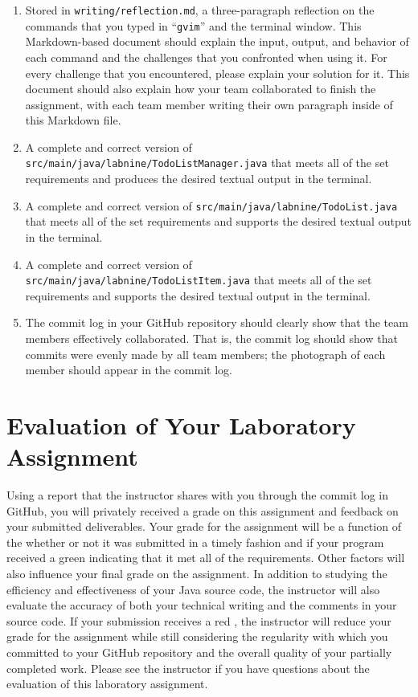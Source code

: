 \documentclass[11pt]{article}
\newcommand{\mainprogramsource}{\lstinline{src/main/java/labnine/TodoListManager.java}}
\newcommand{\secondprogramsource}{\lstinline{src/main/java/labnine/TodoList.java}}
\newcommand{\thirdprogramsource}{\lstinline{src/main/java/labnine/TodoListItem.java}}
\newcommand{\reflection}{\lstinline{writing/reflection.md}}
\newcommand{\command}[1]{``\lstinline{#1}''}
\newcommand{\checkmark}{\ding{51}}
\newcommand{\naughtmark}{\ding{55}}
\begin{document}
\begin{enumerate}

  \setlength{\itemsep}{0in}

\item Stored in \reflection{}, a three-paragraph reflection on the commands that you typed in \command{gvim} and the
  terminal window. This Markdown-based document should explain the input, output, and behavior of each command and the
  challenges that you confronted when using it. For every challenge that you encountered, please explain your solution
  for it. This document should also explain how your team collaborated to finish the assignment, with each team member
  writing their own paragraph inside of this Markdown file.

\item A complete and correct version of \mainprogramsource{} that meets all of the set requirements and produces the
  desired textual output in the terminal.

\item A complete and correct version of \secondprogramsource{} that meets all of the set requirements and supports the
  desired textual output in the terminal.

\item A complete and correct version of \thirdprogramsource{} that meets all of the set requirements and supports the
  desired textual output in the terminal.

\item The commit log in your GitHub repository should clearly show that the team members effectively collaborated. That
  is, the commit log should show that commits were evenly made by all team members; the photograph of each member should
  appear in the commit log.

\end{enumerate}

\section*{Evaluation of Your Laboratory Assignment}

Using a report that the instructor shares with you through the commit log in GitHub, you will privately received a grade
on this assignment and feedback on your submitted deliverables. Your grade for the assignment will be a function of the
whether or not it was submitted in a timely fashion and if your program received a green \checkmark{} indicating that it
met all of the requirements. Other factors will also influence your final grade on the assignment. In addition to
studying the efficiency and effectiveness of your Java source code, the instructor will also evaluate the accuracy of
both your technical writing and the comments in your source code. If your submission receives a red \naughtmark{}, the
instructor will reduce your grade for the assignment while still considering the regularity with which you committed to
your GitHub repository and the overall quality of your partially completed work. Please see the instructor if you have
questions about the evaluation of this laboratory assignment.
\end{document}
